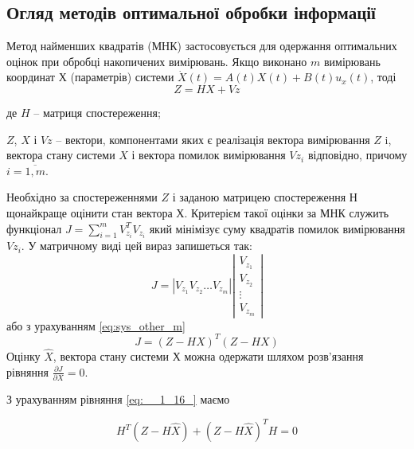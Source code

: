 \subsection{Огляд методів оптимальної обробки інформації}
Метод найменших квадратів (МНК) застосовується для одержання оптимальних оцінок при 
обробці накопичених вимірювань. Якщо виконано $m$ вимірювань координат $Х$ (параметрів) 
системи  $\dot{X}(t)=A(t)X(t)+B(t)u_{x}(t)$, тоді   
\begin{equation}
 Z = HX + Vz                                                                                                                                   \label{eq:sys_other_m}                                                                       
\end{equation}
\begin{ESKDexplanation}
\item де $H$ -- матриця спостереження;
\item $Z$, $X$ і $Vz$  -- вектори, компонентами яких є реалізація 
вектора вимірювання $Z$ i, вектора стану системи $X$ і вектора помилок 
вимірювання $Vz_{i}$  відповідно, причому $i=\overline{1,m}$.
\end{ESKDexplanation}
Необхідно за спостереженнями $Z$ і заданою матрицею спостереження $Н$ щонайкраще 
оцінити стан вектора $Х$. Критерієм такої оцінки за МНК служить функціонал 
$J= \sum _{i=1}^{m}V_{z_{i} }^{T}  V_{z_{i} } $
який  мінімізує  суму  квадратів  помилок  вимірювання   $Vz_{i}$.
У матричному виді цей вираз запишеться так:
\[J=|V_{z_{1} } V_{z_{2} } \ldots V_{z_{m} } |\left|
\begin{array}{c} {V_{z_{1} } } \\ 
{V_{z_{2} } } \\ 
{\vdots } \\ 
{V_{z_{m} } } 
\end{array}\right|\] 
або з урахуванням \eqref{eq:sys_other_m} 
\begin{equation}
J = (Z - HX)^{T}(Z - HX)                                                    
\label{eq:__1_16_}
\end{equation}
Оцінку $\hat{X}$, вектора стану системи $Х$ можна одержати 
шляхом розв'язання  рівняння  $\frac{\partial J}{\partial X} =0$.

З урахуванням рівняння \eqref{eq:__1_16_} маємо

\begin{equation} 
\label{eq:solve_rms_} 
H^{T} (Z-H\hat{X})+(Z-H\hat{X})^{T} H=0 
\end{equation} 

